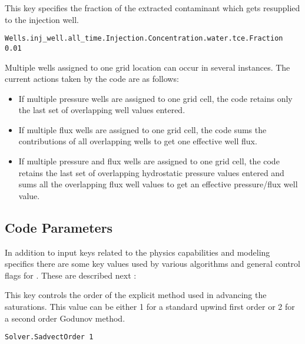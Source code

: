 {
This key specifies the fraction of the extracted contaminant which gets
resupplied to the injection well.
}
\begin{display}\begin{verbatim}
Wells.inj_well.all_time.Injection.Concentration.water.tce.Fraction 0.01
\end{verbatim}\end{display}

\noindent
Multiple wells assigned to one grid location can occur in several
instances.  The current actions taken by the code are as follows:

\begin{itemize}
\item If multiple pressure wells are assigned to one grid cell, the code
      retains only the last set of overlapping well values entered.
\item If multiple flux wells are assigned to one grid cell, the code sums the
      contributions of all overlapping wells to get one effective well flux.
\item If multiple pressure and flux wells are assigned to one grid cell, the
      code retains the last set of overlapping hydrostatic pressure values
      entered and sums all the overlapping flux well values to get an
      effective pressure/flux well value.
\end{itemize}


\subsection{Code Parameters}
\label{Code Parameters}

In addition to input keys related to the physics capabilities
and modeling specifics there are some key values used by various
algorithms and general control flags for \parflow{}.  These
are described next :

{
This key controls the order of the explicit method used in
advancing the saturations.  This value can be either 1 for
a standard upwind first order or 2 for a second order
Godunov method.
}
\begin{display}\begin{verbatim}
Solver.SadvectOrder 1
\end{verbatim}\end{display}

